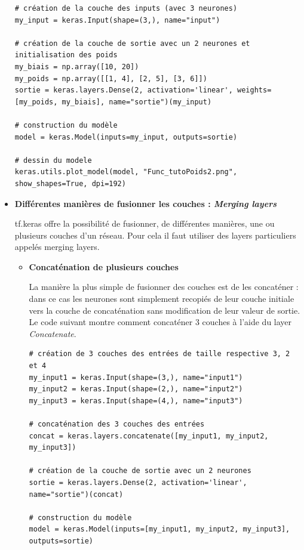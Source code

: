 \begin{itemize}[label=$\square$]
\begin{lstlisting}
# création de la couche des inputs (avec 3 neurones)
my_input = keras.Input(shape=(3,), name="input") 

# création de la couche de sortie avec un 2 neurones et initialisation des poids
my_biais = np.array([10, 20])
my_poids = np.array([[1, 4], [2, 5], [3, 6]])
sortie = keras.layers.Dense(2, activation='linear', weights=[my_poids, my_biais], name="sortie")(my_input)

# construction du modèle
model = keras.Model(inputs=my_input, outputs=sortie)

# dessin du modele
keras.utils.plot_model(model, "Func_tutoPoids2.png", show_shapes=True, dpi=192)
\end{lstlisting}

\item \textbf{Différentes manières de fusionner les couches : \textit{Merging layers}}

tf.keras offre la possibilité de fusionner, de différentes manières, une ou plusieurs couches d'un réseau. Pour cela il faut utiliser des layers particuliers appelés merging layers. 

\begin{itemize}
\item	\textbf{Concaténation de plusieurs couches}

La manière la plus simple de fusionner des couches est de les concaténer : dans ce cas les neurones sont simplement recopiés de leur couche initiale vers la couche de concaténation sans modification de leur valeur de sortie.
Le code suivant montre comment concaténer 3 couches à l'aide du layer \textit{Concatenate}. 
\begin{lstlisting}
# création de 3 couches des entrées de taille respective 3, 2 et 4
my_input1 = keras.Input(shape=(3,), name="input1") 
my_input2 = keras.Input(shape=(2,), name="input2") 
my_input3 = keras.Input(shape=(4,), name="input3") 

# concaténation des 3 couches des entrées 
concat = keras.layers.concatenate([my_input1, my_input2, my_input3])

# création de la couche de sortie avec un 2 neurones
sortie = keras.layers.Dense(2, activation='linear', name="sortie")(concat)

# construction du modèle
model = keras.Model(inputs=[my_input1, my_input2, my_input3], outputs=sortie)
\end{lstlisting}


\end{itemize}
\end{itemize}
